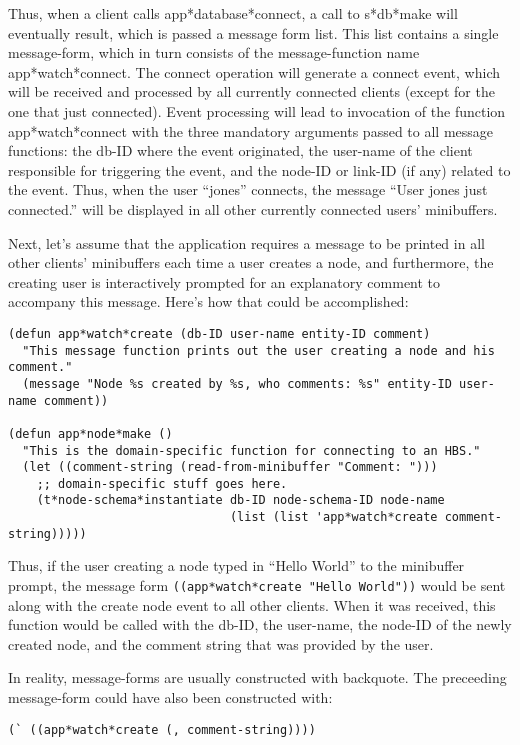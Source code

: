 Thus, when a client calls app*database*connect, a call to s*db*make will
eventually result, which is passed a message form list. This list contains
a single message-form, which in turn consists of the message-function name
app*watch*connect.  The connect operation will generate a connect event,
which will be received and processed by all currently connected clients
(except for the one that just connected).  Event processing will lead to
invocation of the function app*watch*connect with the three mandatory
arguments passed to all message functions: the db-ID where the event
originated, the user-name of the client responsible for triggering the
event, and the node-ID or link-ID (if any) related to the event. Thus, when
the user ``jones'' connects, the message ``User jones just connected.''
will be displayed in all other currently connected users' minibuffers.

Next, let's assume that the application requires a message to be printed in
all other clients' minibuffers each time a user creates a node, and
furthermore, the creating user is interactively prompted for an explanatory
comment to accompany this message.  Here's how that could be accomplished:

\small\begin{verbatim}
(defun app*watch*create (db-ID user-name entity-ID comment)
  "This message function prints out the user creating a node and his comment."
  (message "Node %s created by %s, who comments: %s" entity-ID user-name comment))

(defun app*node*make () 
  "This is the domain-specific function for connecting to an HBS."
  (let ((comment-string (read-from-minibuffer "Comment: ")))
    ;; domain-specific stuff goes here.
    (t*node-schema*instantiate db-ID node-schema-ID node-name 
                               (list (list 'app*watch*create comment-string)))))
\end{verbatim}\normalsize

Thus, if the user creating a node typed in ``Hello World'' to the minibuffer
prompt, the message form {\tt ((app*watch*create "Hello World"))} would be sent
along with the create node event to all other clients. When it was received,
this function would be called with the db-ID, the user-name, the node-ID of the
newly created node, and the comment string that was provided by the user.

In reality, message-forms are usually constructed with backquote.  The
preceeding message-form could have also been constructed with: 

\small\begin{verbatim}
(` ((app*watch*create (, comment-string))))
\end{verbatim}\normalsize
